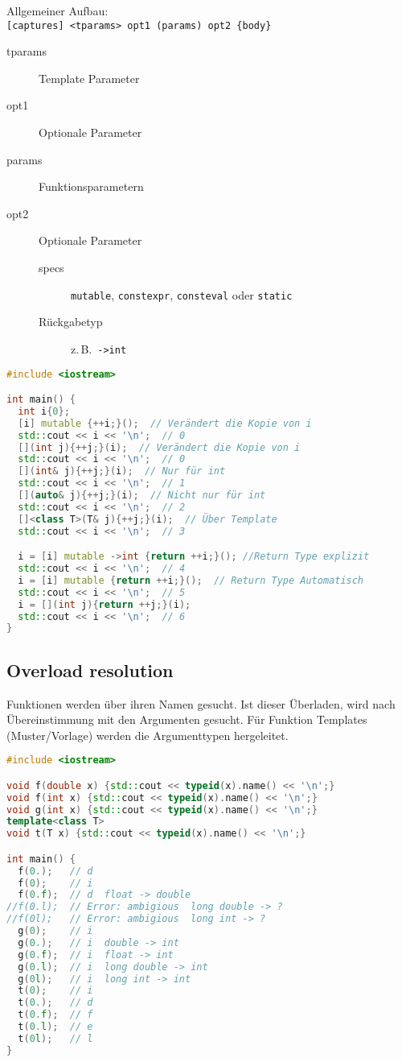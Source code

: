 Allgemeiner Aufbau:\\
\lstinline|[captures] <tparams> opt1 (params) opt2 {body}|\\

\begin{description}
  \item[tparams] Template Parameter
  \item[opt1] Optionale Parameter
  \item[params] Funktionsparametern
  \item[opt2] Optionale Parameter
  \begin{description}
    \item[specs] \lstinline|mutable|, \lstinline|constexpr|,
    \lstinline|consteval| oder \lstinline|static|
    \item[Rückgabetyp] z.\,B.\ \lstinline|->int|
  \end{description}
\end{description}

\begin{lstlisting}[language=C++]
#include <iostream>

int main() {
  int i{0};
  [i] mutable {++i;}();  // Verändert die Kopie von i
  std::cout << i << '\n';  // 0
  [](int j){++j;}(i);  // Verändert die Kopie von i
  std::cout << i << '\n';  // 0
  [](int& j){++j;}(i);  // Nur für int
  std::cout << i << '\n';  // 1
  [](auto& j){++j;}(i);  // Nicht nur für int
  std::cout << i << '\n';  // 2
  []<class T>(T& j){++j;}(i);  // Über Template
  std::cout << i << '\n';  // 3

  i = [i] mutable ->int {return ++i;}(); //Return Type explizit
  std::cout << i << '\n';  // 4
  i = [i] mutable {return ++i;}();  // Return Type Automatisch
  std::cout << i << '\n';  // 5
  i = [](int j){return ++j;}(i);
  std::cout << i << '\n';  // 6
}
\end{lstlisting}

\subsection{Overload resolution}

Funktionen werden über ihren Namen gesucht. Ist dieser Überladen, wird nach
Übereinstimmung mit den Argumenten gesucht. Für Funktion Templates
(Muster/Vorlage) werden die Argumenttypen hergeleitet.

\begin{lstlisting}[language=C++]
#include <iostream>

void f(double x) {std::cout << typeid(x).name() << '\n';}
void f(int x) {std::cout << typeid(x).name() << '\n';}
void g(int x) {std::cout << typeid(x).name() << '\n';}
template<class T>
void t(T x) {std::cout << typeid(x).name() << '\n';}

int main() {
  f(0.);   // d
  f(0);    // i
  f(0.f);  // d  float -> double
//f(0.l);  // Error: ambigious  long double -> ?
//f(0l);   // Error: ambigious  long int -> ?
  g(0);    // i
  g(0.);   // i  double -> int
  g(0.f);  // i  float -> int
  g(0.l);  // i  long double -> int
  g(0l);   // i  long int -> int
  t(0);    // i
  t(0.);   // d
  t(0.f);  // f
  t(0.l);  // e
  t(0l);   // l
}
\end{lstlisting}

